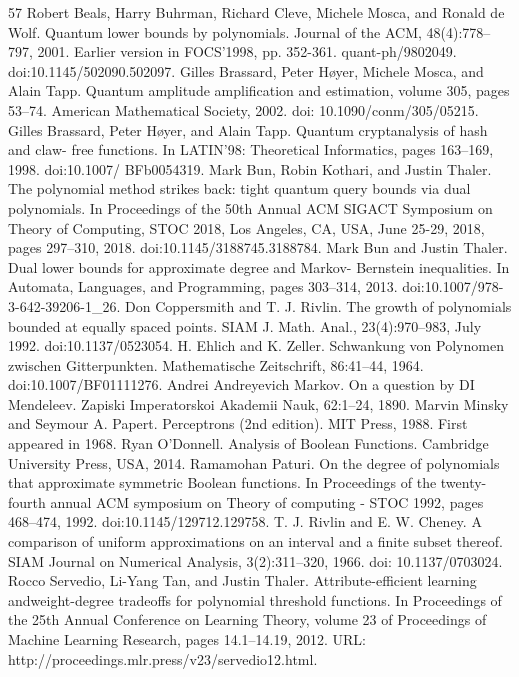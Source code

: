 \documentclass[10pt,a4paper]{article}
\newcommand{\<}{\langle}
\renewcommand{\>}{\rangle}
\begin{document}
\begin{thebibliography}{57}
 Robert Beals, Harry Buhrman, Richard Cleve, Michele Mosca, and Ronald de Wolf. Quantum lower bounds by polynomials. Journal of the ACM, 48(4):778–797, 2001. Earlier version in FOCS’1998, pp. 352-361. quant-ph/9802049. doi:10.1145/502090.502097.
 Gilles Brassard, Peter Høyer, Michele Mosca, and Alain Tapp. Quantum amplitude amplification and estimation, volume 305, pages 53–74. American Mathematical Society, 2002. doi: 10.1090/conm/305/05215.
 Gilles Brassard, Peter Høyer, and Alain Tapp. Quantum cryptanalysis of hash and claw- free functions. In LATIN’98: Theoretical Informatics, pages 163–169, 1998. doi:10.1007/ BFb0054319.
 Mark Bun, Robin Kothari, and Justin Thaler. The polynomial method strikes back: tight quantum query bounds via dual polynomials. In Proceedings of the 50th Annual ACM SIGACT Symposium on Theory of Computing, STOC 2018, Los Angeles, CA, USA, June 25-29, 2018, pages 297–310, 2018. doi:10.1145/3188745.3188784.
 Mark Bun and Justin Thaler. Dual lower bounds for approximate degree and Markov- Bernstein inequalities. In Automata, Languages, and Programming, pages 303–314, 2013. doi:10.1007/978-3-642-39206-1\_26.
 Don Coppersmith and T. J. Rivlin. The growth of polynomials bounded at equally spaced points. SIAM J. Math. Anal., 23(4):970–983, July 1992. doi:10.1137/0523054.
 H. Ehlich and K. Zeller. Schwankung von Polynomen zwischen Gitterpunkten. Mathematische Zeitschrift, 86:41–44, 1964. doi:10.1007/BF01111276.
 Andrei Andreyevich Markov. On a question by DI Mendeleev. Zapiski Imperatorskoi Akademii Nauk, 62:1–24, 1890.
 Marvin Minsky and Seymour A. Papert. Perceptrons (2nd edition). MIT Press, 1988. First appeared in 1968.
 Ryan O’Donnell. Analysis of Boolean Functions. Cambridge University Press, USA, 2014.
 Ramamohan Paturi. On the degree of polynomials that approximate symmetric Boolean functions. In Proceedings of the twenty-fourth annual ACM symposium on Theory of computing - STOC 1992, pages 468–474, 1992. doi:10.1145/129712.129758.
 T. J. Rivlin and E. W. Cheney. A comparison of uniform approximations on an interval and a finite subset thereof. SIAM Journal on Numerical Analysis, 3(2):311–320, 1966. doi: 10.1137/0703024.
 Rocco Servedio, Li-Yang Tan, and Justin Thaler. Attribute-efficient learning andweight-degree tradeoffs for polynomial threshold functions. In Proceedings of the 25th Annual Conference on Learning Theory, volume 23 of Proceedings of Machine Learning Research, pages 14.1–14.19, 2012. URL: http://proceedings.mlr.press/v23/servedio12.html.

\end{thebibliography}
\end{document}
